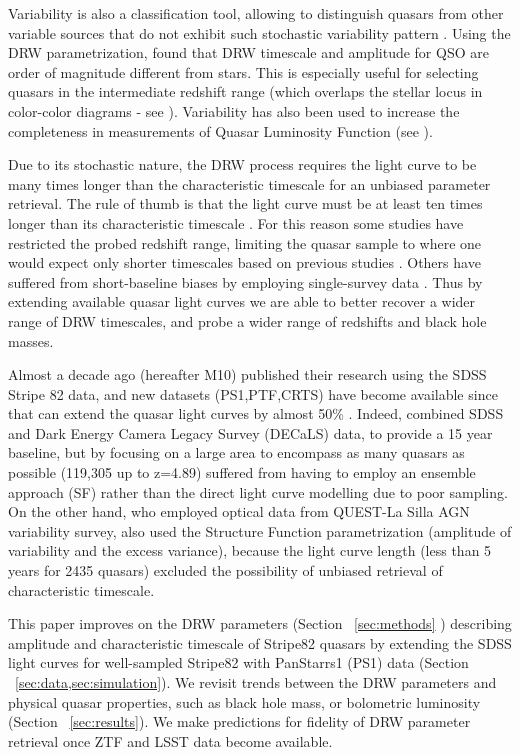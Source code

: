\documentclass[twocolumn]{aastex62}
\begin{document}
Variability is also a classification tool, allowing to distinguish quasars from other variable sources that do not exhibit such stochastic variability pattern \citep{macleod2011}. Using the DRW parametrization, \citep{macleod2011} found that DRW timescale and amplitude for QSO are order of  magnitude different from stars. This is especially useful for selecting quasars in the intermediate redshift range (which overlaps the stellar locus in color-color diagrams - see \citealt{sesar2007, yang2017}). Variability has also been used to increase the completeness in measurements of Quasar Luminosity Function (see \citealt{ ross2013, palanque2013, alsayyad2016, mcgreer2013, mcgreer2018}). 

Due to its stochastic nature, the DRW process requires the light curve to be many times longer than the characteristic timescale for an unbiased parameter retrieval. The rule of thumb is that the light curve must be at least ten times longer than its characteristic timescale \citep{kozlowski2010, kozlowski2017a}. For this reason some studies have restricted the probed redshift range, limiting the quasar sample to where one would expect only shorter timescales based on previous studies \citep{sun2018, guo2017}. Others have suffered from short-baseline biases by employing single-survey data \citep{hernitschek2016}.
Thus by extending available quasar light curves we are able to better recover a wider range of DRW timescales, and probe a wider range of redshifts and black hole masses. 


Almost a decade ago \citet{macleod2010} (hereafter M10) published their research using the SDSS Stripe 82 data, and new datasets (PS1,PTF,CRTS) have become available since that can extend the quasar light curves by almost 50\% .  Indeed, \citep{li2018} combined SDSS and Dark Energy Camera Legacy Survey (DECaLS) data, to provide a 15 year baseline, but by focusing on a large area to encompass as many quasars as possible (119,305 up to z=4.89)  suffered from having to employ an ensemble approach (SF) rather than the direct light curve modelling due to poor sampling.   On the other hand, \citep{sanchez2018} who employed optical data from QUEST-La Silla AGN variability survey, also used the Structure Function parametrization (amplitude of variability and the excess variance), because the light curve length (less than 5 years for 2435 quasars)  excluded the possibility of unbiased retrieval of characteristic timescale. 


 This paper improves on the DRW parameters (Section ~\ref{sec:methods} ) describing amplitude and characteristic timescale of Stripe82 quasars by extending the SDSS light curves for well-sampled Stripe82 with PanStarrs1 (PS1) data (Section ~\ref{sec:data,sec:simulation}). We revisit trends between  the DRW parameters and physical quasar properties, such as black hole mass, or bolometric luminosity (Section ~\ref{sec:results}). We make predictions for fidelity of DRW parameter retrieval once ZTF and LSST data become available. 
\end{document}
